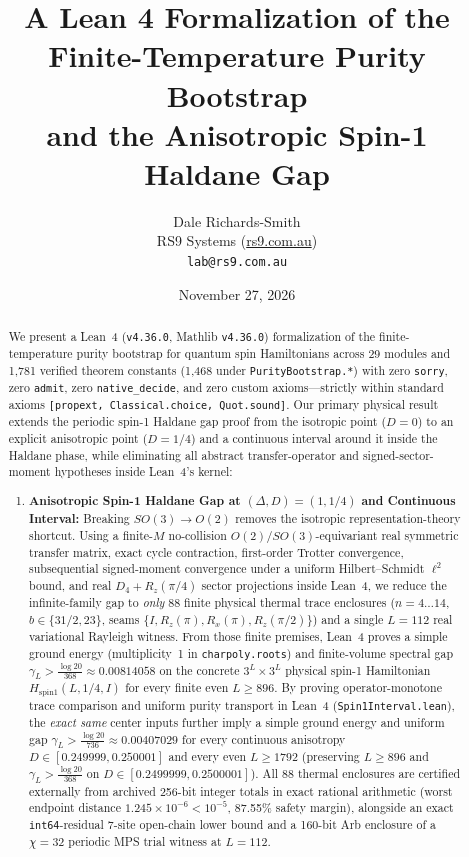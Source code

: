 \documentclass[11pt,a4paper]{article}
\title{\textbf{A Lean 4 Formalization of the Finite-Temperature Purity Bootstrap\\and the Anisotropic Spin-1 Haldane Gap}}
\author{Dale Richards-Smith\\
RS9 Systems (\href{https://rs9.com.au}{rs9.com.au})\\
\texttt{lab@rs9.com.au}}
\date{November 27, 2026}
\newcommand{\id}[1]{{\small\nolinkurl{#1}}}
\begin{document}
\maketitle

\begin{abstract}
We present a Lean~4 (\id{v4.36.0}, Mathlib \id{v4.36.0}) formalization of the finite-temperature purity bootstrap for quantum spin Hamiltonians across 29 modules and 1{,}781 verified theorem constants (1{,}468 under \id{PurityBootstrap.*}) with zero \id{sorry}, zero \id{admit}, zero \id{native_decide}, and zero custom axioms---strictly within standard axioms \id{[propext, Classical.choice, Quot.sound]}.
Our primary physical result extends the periodic spin-1 Haldane gap proof from the isotropic point ($D = 0$) to an explicit anisotropic point ($D = 1/4$) and a continuous interval around it inside the Haldane phase, while eliminating all abstract transfer-operator and signed-sector-moment hypotheses inside Lean~4's kernel:
\begin{enumerate}[leftmargin=1.8em,itemsep=2pt]
  \item \textbf{Anisotropic Spin-1 Haldane Gap at $(\Delta, D) = (1, 1/4)$ and Continuous Interval:} Breaking $SO(3) \to O(2)$ removes the isotropic representation-theory shortcut. Using a finite-$M$ no-collision $O(2)/SO(3)$-equivariant real symmetric transfer matrix, exact cycle contraction, first-order Trotter convergence, subsequential signed-moment convergence under a uniform Hilbert--Schmidt $\ell^2$ bound, and real $D_4 + R_z(\pi/4)$ sector projections inside Lean~4, we reduce the infinite-family gap to \emph{only} 88 finite physical thermal trace enclosures ($n=4\ldots 14$, $b \in \{31/2, 23\}$, seams $\{I, R_z(\pi), R_x(\pi), R_z(\pi/2)\}$) and a single $L=112$ real variational Rayleigh witness. From those finite premises, Lean~4 proves a simple ground energy (multiplicity~1 in \id{charpoly.roots}) and finite-volume spectral gap $\gamma_L > \frac{\log 20}{368} \approx 0.00814058$ on the concrete $3^L \times 3^L$ physical spin-1 Hamiltonian $H_{\mathrm{spin1}}(L, 1/4, I)$ for every finite even $L \ge 896$. By proving operator-monotone trace comparison and uniform purity transport in Lean~4 (\id{Spin1Interval.lean}), the \emph{exact same} center inputs further imply a simple ground energy and uniform gap $\gamma_L > \frac{\log 20}{736} \approx 0.00407029$ for every continuous anisotropy $D \in [0.249999, 0.250001]$ and every even $L \ge 1792$ (preserving $L \ge 896$ and $\gamma_L > \frac{\log 20}{368}$ on $D \in [0.2499999, 0.2500001]$). All 88 thermal enclosures are certified externally from archived 256-bit integer totals in exact rational arithmetic (worst endpoint distance $1.245 \times 10^{-6} < 10^{-5}$, 87.55\% safety margin), alongside an exact \id{int64}-residual 7-site open-chain lower bound and a 160-bit Arb enclosure of a $\chi = 32$ periodic MPS trial witness at $L = 112$.

\end{enumerate}
\end{abstract}
\end{document}
